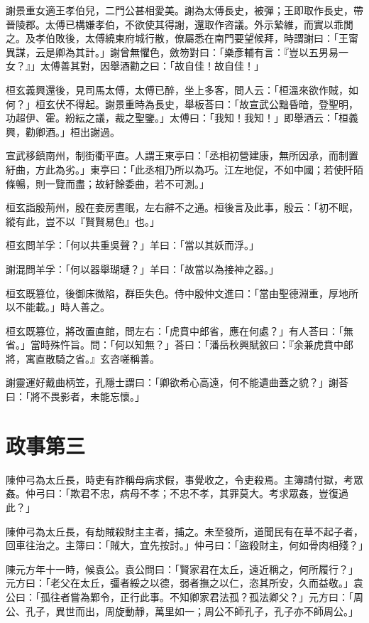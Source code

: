 謝景重女適王孝伯兒，二門公甚相愛美。謝為太傅長史，被彈；王即取作長史，帶晉陵郡。太傅已構嫌孝伯，不欲使其得謝，還取作咨議。外示縶維，而實以乖閒之。及孝伯敗後，太傅繞東府城行散，僚屬悉在南門要望候拜，時謂謝曰：「王甯異謀，云是卿為其計。」謝曾無懼色，斂笏對曰：「樂彥輔有言：『豈以五男易一女？』」太傅善其對，因舉酒勸之曰：「故自佳！故自佳！」

桓玄義興還後，見司馬太傅，太傅已醉，坐上多客，問人云：「桓溫來欲作賊，如何？」桓玄伏不得起。謝景重時為長史，舉板荅曰：「故宣武公黜昏暗，登聖明，功超伊、霍。紛紜之議，裁之聖鑒。」太傅曰：「我知！我知！」即舉酒云：「桓義興，勸卿酒。」桓出謝過。

宣武移鎮南州，制街衢平直。人謂王東亭曰：「丞相初營建康，無所因承，而制置紆曲，方此為劣。」東亭曰：「此丞相乃所以為巧。江左地促，不如中國；若使阡陌條暢，則一覽而盡；故紆餘委曲，若不可測。」

桓玄詣殷荊州，殷在妾房晝眠，左右辭不之通。桓後言及此事，殷云：「初不眠，縱有此，豈不以『賢賢易色』也。」

桓玄問羊孚：「何以共重吳聲？」羊曰：「當以其妖而浮。」

謝混問羊孚：「何以器舉瑚璉？」羊曰：「故當以為接神之器。」

桓玄既篡位，後御床微陷，群臣失色。侍中殷仲文進曰：「當由聖德淵重，厚地所以不能載。」時人善之。

桓玄既篡位，將改置直館，問左右：「虎賁中郎省，應在何處？」有人荅曰：「無省。」當時殊忤旨。問：「何以知無？」荅曰：「潘岳秋興賦敘曰：『余兼虎賁中郎將，寓直散騎之省。』玄咨嗟稱善。

謝靈運好戴曲柄笠，孔隱士謂曰：「卿欲希心高遠，何不能遺曲蓋之貌？」謝荅曰：「將不畏影者，未能忘懷。」



\chapter{政事第三}

陳仲弓為太丘長，時吏有詐稱母病求假，事覺收之，令吏殺焉。主簿請付獄，考眾姦。仲弓曰：「欺君不忠，病母不孝；不忠不孝，其罪莫大。考求眾姦，豈復過此？」

陳仲弓為太丘長，有劫賊殺財主主者，捕之。未至發所，道聞民有在草不起子者，回車往治之。主簿曰：「賊大，宜先按討。」仲弓曰：「盜殺財主，何如骨肉相殘？」

陳元方年十一時，候袁公。袁公問曰：「賢家君在太丘，遠近稱之，何所履行？」元方曰：「老父在太丘，彊者綏之以德，弱者撫之以仁，恣其所安，久而益敬。」袁公曰：「孤往者嘗為鄴令，正行此事。不知卿家君法孤？孤法卿父？」元方曰：「周公、孔子，異世而出，周旋動靜，萬里如一；周公不師孔子，孔子亦不師周公。」

